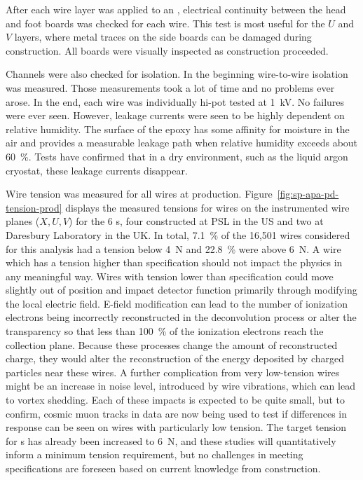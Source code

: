 
After each wire layer was applied to an , electrical continuity between the head and foot boards was checked for each wire.  This test is most useful for the $U$ and $V$ layers, where metal traces on the side boards can be damaged during construction. All boards were visually inspected as construction proceeded.

Channels were also checked for isolation.  In the beginning wire-to-wire isolation was measured. Those measurements took a lot of time and no problems ever arose.  In the end, each wire was individually hi-pot tested at \SI{1}{kV}. No failures were ever seen. However, leakage currents were seen to be highly dependent on relative humidity.  The surface of the epoxy has some affinity for moisture in the air and provides a measurable leakage path when relative humidity exceeds about \SI{60}{\%}. Tests have confirmed that in a dry environment, such as the liquid argon cryostat, these leakage currents disappear.

Wire tension was measured for all wires at production.  Figure~\ref{fig:sp-apa-pd-tension-prod} displays the measured tensions for wires on the instrumented wire planes ($X, U, V$) for the 6  s, four constructed at PSL in the US and two at Daresbury Laboratory in the UK.  %
In total, \SI{7.1}{\%} of the 16,501 wires considered for this analysis had a tension below \SI{4}{N} and \SI{22.8}{\%} were above \SI{6}{N}. 
A wire which has a tension higher than specification should not impact the physics in any meaningful way. Wires with tension lower than specification could move slightly out of position and impact detector function primarily through modifying the local electric field. E-field modification can lead to the number of ionization electrons being incorrectly reconstructed in the deconvolution process or alter the transparency so that less than \SI{100}{\%} of the ionization electrons reach the collection plane. Because these processes change the amount of reconstructed charge, they would alter the reconstruction of the energy deposited by charged particles near these wires. A further complication from very low-tension wires might be an increase in noise level, introduced by wire vibrations, which can lead to vortex shedding.  Each of these impacts is expected to be quite small, but to confirm, cosmic muon tracks in  data are now being used to test if differences in response can be seen on wires with particularly low tension.  The target tension for  s has already been increased to \SI{6}{N}, and these  studies will quantitatively inform a minimum tension requirement, but no challenges in meeting specifications are foreseen based on current knowledge from  construction.   

